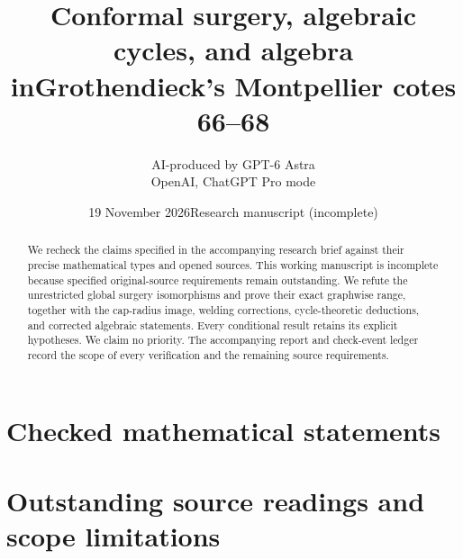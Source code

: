 \documentclass[11pt,a4paper]{article}
\title{Conformal surgery, algebraic cycles, and algebra in\newline Grothendieck's Montpellier cotes 66--68}
\author{AI-produced by GPT-6 Astra\\OpenAI, ChatGPT Pro mode}
\date{19 November 2026\quad Research manuscript (incomplete)}
\theoremstyle{definition}
\begin{document}
\maketitle
\begin{abstract}
We recheck the claims specified in the accompanying research brief against their precise mathematical types and opened sources. This working manuscript is incomplete because specified original-source requirements remain outstanding. We refute the unrestricted global surgery isomorphisms and prove their exact graphwise range, together with the cap-radius image, welding corrections, cycle-theoretic deductions, and corrected algebraic statements. Every conditional result retains its explicit hypotheses. We claim no priority. The accompanying report and check-event ledger record the scope of every verification and the remaining source requirements.
\end{abstract}
\tableofcontents
\clearpage
\part{Checked mathematical statements}




\clearpage
\part{Outstanding source readings and scope limitations}


\end{document}
